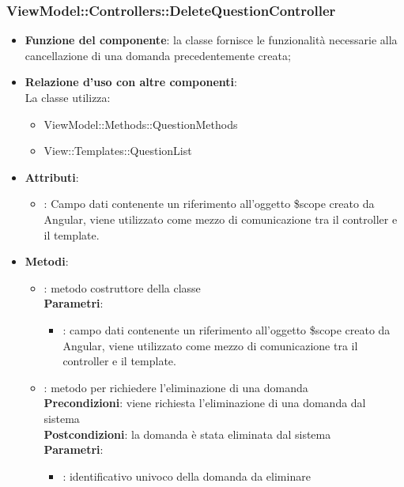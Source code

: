 \subsubsection{ViewModel::Controllers::DeleteQuestionController}
\begin{itemize}
\item\textbf{Funzione del componente}: la classe fornisce le funzionalità necessarie alla cancellazione di una domanda precedentemente creata;
	\item\textbf{Relazione d'uso con altre componenti}: \\
La classe utilizza:
	\begin{itemize}
		\item ViewModel::Methods::QuestionMethods
		\item View::Templates::QuestionList
	\end{itemize}
\item\textbf{Attributi}:
	\begin{itemize}
		\item{}: Campo dati contenente un riferimento all’oggetto \$scope creato da Angular, viene utilizzato come mezzo di comunicazione tra il controller e il template.\\

	\end{itemize}
\item\textbf{Metodi}:
	\begin{itemize}
		\item{}: metodo costruttore della classe\\
		\textbf{Parametri}:
			\begin{itemize}
				\item{}: campo dati contenente un riferimento all’oggetto \$scope creato da Angular, viene utilizzato come mezzo di comunicazione tra il controller e il template.\\
			\end{itemize}
		\item{}: metodo per richiedere l'eliminazione di una domanda\\
		\textbf{Precondizioni}: viene richiesta l'eliminazione di una domanda dal sistema\\
		\textbf{Postcondizioni}: la domanda è stata eliminata dal sistema\\
		\textbf{Parametri}:
			\begin{itemize}
				\item{}: identificativo univoco della domanda da eliminare\\
			\end{itemize}
	\end{itemize}
\end{itemize}

